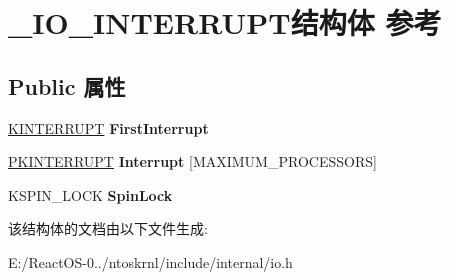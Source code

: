 \hypertarget{struct___i_o___i_n_t_e_r_r_u_p_t}{}\section{\+\_\+\+I\+O\+\_\+\+I\+N\+T\+E\+R\+R\+U\+P\+T结构体 参考}
\label{struct___i_o___i_n_t_e_r_r_u_p_t}
\subsection*{Public 属性}
\begin{DoxyCompactItemize}
\item 
\mbox{\label{struct___i_o___i_n_t_e_r_r_u_p_t_ab55647888e62e7f2c0e3fb5462080b1f}} 
\hyperlink{struct___k_i_n_t_e_r_r_u_p_t}{K\+I\+N\+T\+E\+R\+R\+U\+PT} {\bfseries First\+Interrupt}
\item 
\mbox{\label{struct___i_o___i_n_t_e_r_r_u_p_t_a9ce40b15011d4c3ee3fa8054687e7a59}} 
\hyperlink{struct___k_i_n_t_e_r_r_u_p_t}{P\+K\+I\+N\+T\+E\+R\+R\+U\+PT} {\bfseries Interrupt} \mbox{[}M\+A\+X\+I\+M\+U\+M\+\_\+\+P\+R\+O\+C\+E\+S\+S\+O\+RS\mbox{]}
\item 
\mbox{\label{struct___i_o___i_n_t_e_r_r_u_p_t_a84fa67beff4318ecea4bad01753a0827}} 
K\+S\+P\+I\+N\+\_\+\+L\+O\+CK {\bfseries Spin\+Lock}
\end{DoxyCompactItemize}


该结构体的文档由以下文件生成\+:\begin{DoxyCompactItemize}
\item 
E\+:/\+React\+O\+S-\/0../ntoskrnl/include/internal/io.\+h\end{DoxyCompactItemize}
